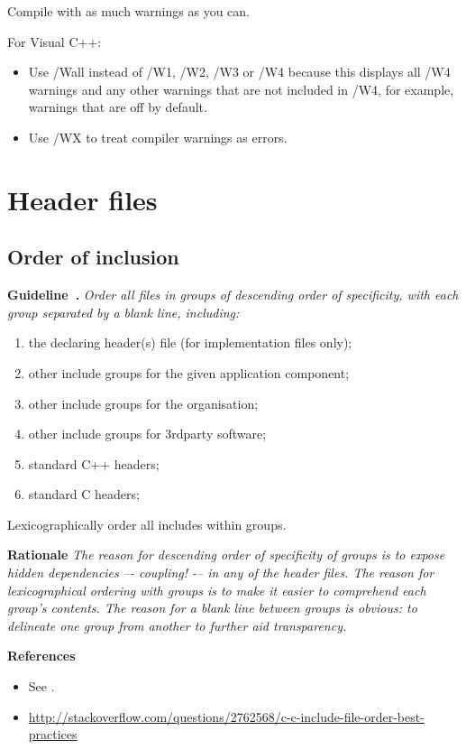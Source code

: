 \documentclass{article}
\newcounter{guideline}
\newenvironment{guideline}[1][]{\refstepcounter{guideline}\par\medskip
   \noindent \textbf{Guideline~\theguideline. #1} \em \rmfamily}{\medskip}
\newenvironment{rationale}{\par\medskip
   \noindent \textbf{Rationale} \em \rmfamily}{\medskip}
\newenvironment{references}{\par\medskip
   \noindent \textbf{References} \em \rmfamily \begin{itemize}}{\end{itemize}\medskip}
\begin{document}
Compile with as much warnings as you can.

For Visual C++:
\begin{itemize}
	\item Use /Wall instead of /W1, /W2, /W3 or /W4 because this displays all /W4 warnings and any other warnings that are not included in /W4, for example, warnings that are off by default.
	\item Use /WX to treat compiler warnings as errors.
\end{itemize}

\section{Header files}

\subsection{Order of inclusion}
\begin{guideline}
Order all files in groups of descending order of specificity, with each group separated by a blank line, including:
\begin{enumerate}
\item the declaring header(s) file (for implementation files only);
\item other include groups for the given application component;
\item other include groups for the organisation;
\item other include groups for 3rdparty software;
\item standard C++ headers;
\item standard C headers;
\end{enumerate}
Lexicographically order all includes within groups.
\begin{rationale}
The reason for descending order of specificity of groups is to expose hidden
dependencies –- coupling! -– in any of the header files.  The reason for
lexicographical ordering with groups is to make it easier to comprehend each
group’s contents.  The reason for a blank line between groups is obvious: to
delineate one group from another to further aid transparency.
\end{rationale}
\begin{references}
\item See \cite{wilson2016,sutter2004,lakos1996}.
\item \url{http://stackoverflow.com/questions/2762568/c-c-include-file-order-best-practices}
\end{references}
\end{guideline}
\end{document}

